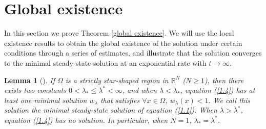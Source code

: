 \documentclass{article}
\numberwithin{equation}{section}
\newtheorem{lemma}{Lemma}[section]
\begin{document}
\section{Global existence}

\qquad In this section we prove Theorem \ref{global existence}. We will use the local existence results to obtain the global existence of the solution under certain conditions through a series of estimates, and illustrate that the solution converges to the minimal steady-state solution at an exponential rate with $t\to \infty$.

\begin{lemma}[\cite{lia}]
    If $\Omega$ is a strictly star-shaped region in $\mathbb{R}^{N}$ ($N \geq 1$), then there exists two constants $0<\lambda_{*} \le \lambda^{*}<\infty$, and when $\lambda<\lambda_{*}$, equation (\ref{1.4}) has at least one minimal solution $w_{\lambda}$ that satisfies $\forall x \in \Omega$, $w_{\lambda}(x)<1$. We call this solution the minimal steady-state solution of equation (\ref{1.1}). When $\lambda>\lambda^{*}$, equation (\ref{1.4}) has no solution. In particular, when $N=1$, $\lambda_{*} = \lambda^{*}$.
\label{sou 1}
\end{lemma}
\end{document}
